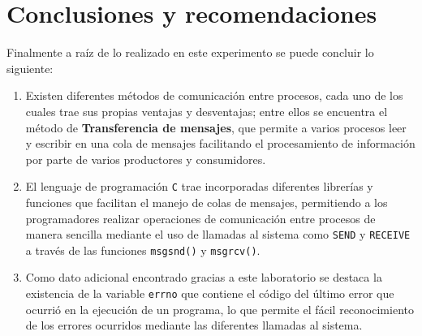 \section{Conclusiones y recomendaciones}
Finalmente a raíz de lo realizado en este experimento se puede concluir lo siguiente:
\begin{enumerate}
  \item Existen diferentes métodos de comunicación entre procesos, cada uno de los cuales trae sus propias ventajas y desventajas; entre ellos se encuentra el método de \textbf{Transferencia de mensajes}, que permite a varios procesos leer y escribir en una cola de mensajes facilitando el procesamiento de información por parte de varios productores y consumidores.
  \item El lenguaje de programación \texttt{C} trae incorporadas diferentes librerías y funciones que facilitan el manejo de colas de mensajes, permitiendo a los programadores realizar operaciones de comunicación entre procesos de manera sencilla mediante el uso de llamadas al sistema como \texttt{SEND} y \texttt{RECEIVE} a través de las funciones \texttt{msgsnd()} y \texttt{msgrcv()}.
  \item Como dato adicional encontrado gracias a este laboratorio se destaca la existencia de la variable \texttt{errno} que contiene el código del último error que ocurrió en la ejecución de un programa, lo que permite el fácil reconocimiento de los errores ocurridos mediante las diferentes llamadas al sistema.
\end{enumerate}